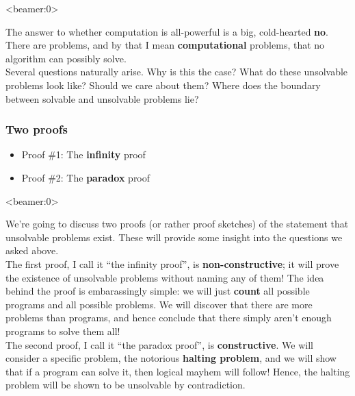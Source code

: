 \documentclass[handout, 12pt]{beamer}
\begin{document}
\begin{frame}<beamer:0>

\footnotesize
The answer to whether computation is all-powerful is a big, cold-hearted \textbf{no}. There are problems, and by that I mean \textbf{computational} problems, that no algorithm can possibly solve.
\\[0.6em]
Several questions naturally arise. Why is this the case? What do these unsolvable problems look like? Should we care about them? Where does the boundary between solvable and unsolvable problems lie?

\end{frame}

\begin{frame}

\frametitle{Two proofs}

\begin{itemize}
\addtolength{\itemsep}{1\baselineskip}
\item Proof \#1: The \textbf{infinity} proof
\item Proof \#2: The \textbf{paradox} proof
\end{itemize}

\end{frame}

\begin{frame}<beamer:0>

\footnotesize
We're going to discuss two proofs (or rather proof sketches) of the statement that unsolvable problems exist. These will provide some insight into the questions we asked above.
\\[0.6em]
The first proof, I call it ``the infinity proof'', is \textbf{non-constructive}; it will prove the existence of unsolvable problems without naming any of them! The idea behind the proof is embarassingly simple: we will just \textbf{count} all possible programs and all possible problems. We will discover that there are more problems than programs, and hence conclude that there simply aren't enough programs to solve them all!
\\[0.6em]
The second proof, I call it ``the paradox proof'', is \textbf{constructive}. We will consider a specific problem, the notorious \textbf{halting problem}, and we will show that if a program can solve it, then logical mayhem will follow! Hence, the halting problem will be shown to be unsolvable by contradiction.

\end{frame}
\end{document}
